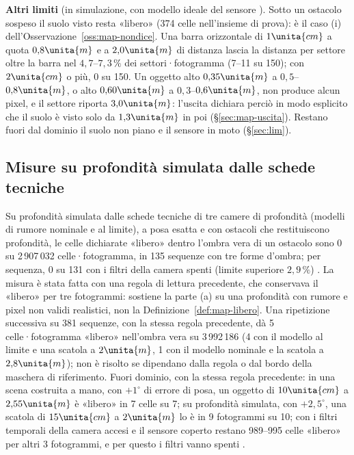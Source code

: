 \textbf{Altri limiti} (in simulazione, con modello ideale del sensore ). Sotto un ostacolo sospeso il suolo visto resta «libero» (374 celle nell'insieme di prova): è il caso (i) dell'Osservazione~\ref{oss:map-nondice}. Una barra orizzontale di $1\unita{cm}$ a quota $0{,}8\unita{m}$ e a $2{,}0\unita{m}$ di distanza lascia la distanza per settore oltre la barra nel $4{,}7$–$7{,}3\,\%$ dei settori·fotogramma (7–11 su 150); con $2\unita{cm}$ o più, 0 su 150. Un oggetto alto $0{,}35\unita{m}$ a $0{,}5$–$0{,}8\unita{m}$, o alto $0{,}60\unita{m}$ a $0{,}3$–$0{,}6\unita{m}$, non produce alcun pixel, e il settore riporta $3{,}0\unita{m}$: l'uscita dichiara perciò in modo esplicito che il suolo è visto solo da $1{,}3\unita{m}$ in poi (\S\ref{sec:map-uscita}). Restano fuori dal dominio il suolo non piano e il sensore in moto (\S\ref{sec:lim}).

\subsection{Misure su profondità simulata dalle schede tecniche}\label{sec:map-schede}

Su profondità simulata dalle schede tecniche di tre camere di profondità (modelli di rumore nominale e al limite), a posa esatta e con ostacoli che restituiscono profondità, le celle dichiarate «libero» dentro l'ombra vera di un ostacolo sono 0 su 2\,907\,032 celle·fotogramma, in 135 sequenze con tre forme d'ombra; per sequenza, 0 su 131 con i filtri della camera spenti (limite superiore $2{,}9\,\%$) . La misura è stata fatta con una regola di lettura precedente, che conservava il «libero» per tre fotogrammi: sostiene la parte (a) su una profondità con rumore e pixel non validi realistici, non la Definizione~\ref{def:map-libero}. Una ripetizione successiva su 381 sequenze, con la stessa regola precedente, dà 5 celle·fotogramma «libero» nell'ombra vera su 3\,992\,186 (4 con il modello al limite e una scatola a $2\unita{m}$, 1 con il modello nominale e la scatola a $2{,}8\unita{m}$); non è risolto se dipendano dalla regola o dal bordo della maschera di riferimento. Fuori dominio, con la stessa regola precedente: in una scena costruita a mano, con $+1^\circ$ di errore di posa, un oggetto di $10\unita{cm}$ a $2{,}55\unita{m}$ è «libero» in 7 celle su 7; su profondità simulata, con $+2{,}5^\circ$, una scatola di $15\unita{cm}$ a $2\unita{m}$ lo è in 9 fotogrammi su 10; con i filtri temporali della camera accesi e il sensore coperto restano 989–995 celle «libero» per altri 3 fotogrammi, e per questo i filtri vanno spenti .

